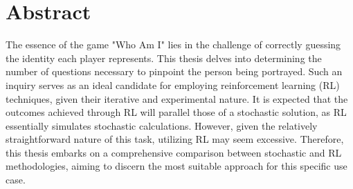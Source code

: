 \chapter{Abstract}

The essence of the game "Who Am I" lies in the challenge of correctly guessing the identity each player represents. This thesis delves into determining the number of questions necessary to pinpoint the person being portrayed. Such an inquiry serves as an ideal candidate for employing reinforcement learning (RL) techniques, given their iterative and experimental nature. It is expected that the outcomes achieved through RL will parallel those of a stochastic solution, as RL essentially simulates stochastic calculations. However, given the relatively straightforward nature of this task, utilizing RL may seem excessive. Therefore, this thesis embarks on a comprehensive comparison between stochastic and RL methodologies, aiming to discern the most suitable approach for this specific use case.